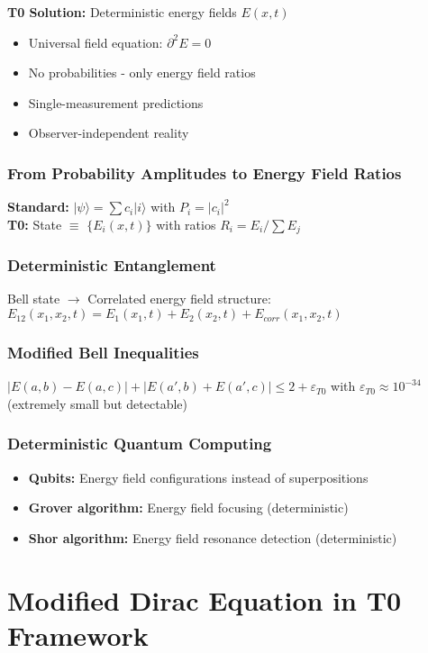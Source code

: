 \documentclass[12pt,a4paper]{report}
\begin{document}
	\textbf{T0 Solution:} Deterministic energy fields $E(x,t)$
	\begin{itemize}
		\item Universal field equation: $\partial^2 E = 0$
		\item No probabilities - only energy field ratios
		\item Single-measurement predictions
		\item Observer-independent reality
	\end{itemize}
	
	\subsubsection{From Probability Amplitudes to Energy Field Ratios}
	\textbf{Standard:} $|\psi\rangle = \sum c_i |i\rangle$ with $P_i = |c_i|^2$\\
	\textbf{T0:} State $\equiv$ $\{E_i(x,t)\}$ with ratios $R_i = E_i/\sum E_j$
	
	\subsubsection{Deterministic Entanglement}
	Bell state $\rightarrow$ Correlated energy field structure:
	$E_{12}(x_1,x_2,t) = E_1(x_1,t) + E_2(x_2,t) + E_{corr}(x_1,x_2,t)$
	
	\subsubsection{Modified Bell Inequalities}
	$|E(a,b) - E(a,c)| + |E(a',b) + E(a',c)| \leq 2 + \varepsilon_{T0}$
	with $\varepsilon_{T0} \approx 10^{-34}$ (extremely small but detectable)
	
	\subsubsection{Deterministic Quantum Computing}
	\begin{itemize}
		\item \textbf{Qubits:} Energy field configurations instead of superpositions
		\item \textbf{Grover algorithm:} Energy field focusing (deterministic)
		\item \textbf{Shor algorithm:} Energy field resonance detection (deterministic)
	\end{itemize}
	
	\section{Modified Dirac Equation in T0 Framework}
\end{document}
